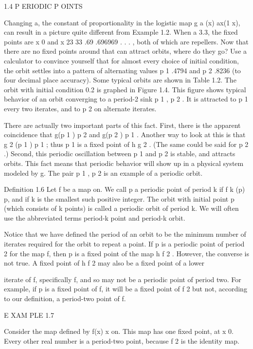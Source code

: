 \documentclass[12pt]{article}
\begin{document}
1.4 P ERIODIC P OINTS

Changing a, the constant of proportionality in the logistic map g a (x)  ax(1  x), can result in a picture 
quite different from Example 1.2. When a  3.3, the fixed points are x  0 and x  23  33  .69  .696969 . . . 
, both of which are repellers. Now that there are no fixed points around that can attract orbits, where do 
they go? Use a calculator to convince yourself that for almost every choice of initial condition, the orbit 
settles into a pattern of alternating values p 1  .4794 and p 2  .8236 (to four decimal place accuracy). 
Some typical orbits are shown in Table 1.2. The orbit with initial condition 0.2 is graphed in Figure 1.4. 
This figure shows typical behavior of an orbit converging to a period-2 sink p 1 , p 2  . It is attracted 
to p 1 every two iterates, and to p 2 on alternate iterates.

There are actually two important parts of this fact. First, there is the apparent coincidence that g(p 1 )  
p 2 and g(p 2 )  p 1 . Another way to look at this is that g 2 (p 1 )  p 1 ; thus p 1 is a fixed point of h  
g 2 . (The same could be said for p 2 .) Second, this periodic oscillation between p 1 and p 2 is stable, 
and attracts orbits. This fact means that periodic behavior will show up in a physical system modeled by g. 
The pair p 1 , p 2  is an example of a periodic orbit.

Definition 1.6 Let f be a map on. We call p a periodic point of period k if f k (p)  p, and if k is the 
smallest such positive integer. The orbit with initial point p (which consists of k points) is called a 
periodic orbit of period k. We will often use the abbreviated terms period-k point and period-k orbit.

Notice that we have defined the period of an orbit to be the minimum number of iterates required for the 
orbit to repeat a point. If p is a periodic point of period 2 for the map f, then p is a fixed point of the 
map h  f 2 . However, the converse is not true. A fixed point of h  f 2 may also be a fixed point of a 
lower


iterate of f, specifically f, and so may not be a periodic point of period two. For example, if p is a 
fixed point of f, it will be a fixed point of f 2 but not, according to our definition, a period-two point 
of f.

E XAM PLE 1.7

Consider the map defined by f(x)  x on. This map has one fixed point, at x  0. Every other real number is a 
period-two point, because f 2 is the identity map.
\end{document}
